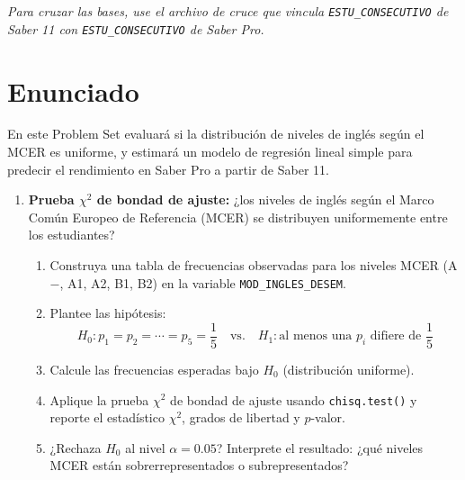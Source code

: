 \documentclass[11pt, a4paper]{article}
\begin{document}
\vspace{4pt}
\textit{Para cruzar las bases, use el archivo de cruce que vincula
\texttt{ESTU\_CONSECUTIVO} de Saber 11 con \texttt{ESTU\_CONSECUTIVO}
de Saber Pro.}

\section*{Enunciado}

En este Problem Set evaluar\'a si la distribuci\'on de niveles de ingl\'es
seg\'un el MCER es uniforme, y estimar\'a un modelo de regresi\'on lineal
simple para predecir el rendimiento en Saber Pro a partir de Saber 11.

\begin{enumerate}[label=\arabic*)]
  \item \textbf{Prueba $\chi^2$ de bondad de ajuste:} ¿los niveles de ingl\'es
        seg\'un el Marco Com\'un Europeo de Referencia (MCER) se distribuyen
        uniformemente entre los estudiantes?
        \begin{enumerate}[label=\alph*)]
          \item Construya una tabla de frecuencias observadas para los niveles
                MCER (A$-$, A1, A2, B1, B2) en la variable
                \texttt{MOD\_INGLES\_DESEM}.
          \item Plantee las hip\'otesis:
                \[
                  H_0: p_1 = p_2 = \cdots = p_5 = \frac{1}{5}
                  \quad \text{vs.} \quad
                  H_1: \text{al menos una } p_i \text{ difiere de } \frac{1}{5}
                \]
          \item Calcule las frecuencias esperadas bajo $H_0$ (distribuci\'on
                uniforme).
          \item Aplique la prueba $\chi^2$ de bondad de ajuste usando
                \texttt{chisq.test()} y reporte el estad\'istico $\chi^2$,
                grados de libertad y $p$-valor.
          \item ¿Rechaza $H_0$ al nivel $\alpha = 0.05$? Interprete el
                resultado: ¿qu\'e niveles MCER est\'an sobrerrepresentados
                o subrepresentados?
        \end{enumerate}


\end{enumerate}
\end{document}
